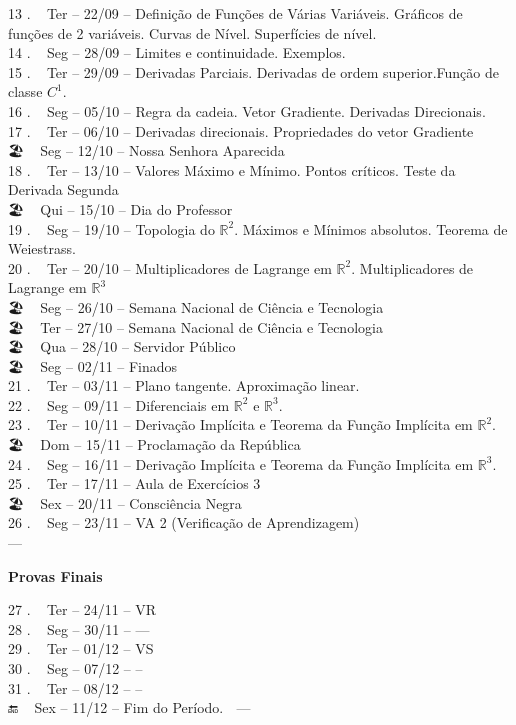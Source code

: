 \documentclass[
  letterpaper,
  DIV=11,
  numbers=noendperiod]{scrartcl}
\begin{document}
13 . ~ Ter -- 22/09 -- { Definição de Funções de Várias Variáveis.
Gráficos de funções de 2 variáveis. Curvas de Nível. Superfícies de
nível. }\\
14 . ~ Seg -- 28/09 -- { Limites e continuidade. Exemplos. }\\
15 . ~ Ter -- 29/09 -- { Derivadas Parciais. Derivadas de ordem
superior.Função de classe \(C^1\). }\\
16 . ~ Seg -- 05/10 -- { Regra da cadeia. Vetor Gradiente. Derivadas
Direcionais. }\\
17 . ~ Ter -- 06/10 -- { Derivadas direcionais. Propriedades do vetor
Gradiente }\\
{🏖️} { ~ Seg -- 12/10 -- Nossa Senhora Aparecida }\\
18 . ~ Ter -- 13/10 -- { Valores Máximo e Mínimo. Pontos críticos. Teste
da Derivada Segunda }\\
{🏖️} { ~ Qui -- 15/10 -- Dia do Professor }\\
19 . ~ Seg -- 19/10 -- { Topologia do \(\mathbb{R}^2\). Máximos e
Mínimos absolutos. Teorema de Weiestrass. }\\
20 . ~ Ter -- 20/10 -- { Multiplicadores de Lagrange em
\(\mathbb{R}^2\). Multiplicadores de Lagrange em \(\mathbb{R}^3\) }\\
{🏖️} { ~ Seg -- 26/10 -- Semana Nacional de Ciência e Tecnologia }\\
{🏖️} { ~ Ter -- 27/10 -- Semana Nacional de Ciência e Tecnologia }\\
{🏖️} { ~ Qua -- 28/10 -- Servidor Público }\\
{🏖️} { ~ Seg -- 02/11 -- Finados }\\
21 . ~ Ter -- 03/11 -- { Plano tangente. Aproximação linear. }\\
22 . ~ Seg -- 09/11 -- { Diferenciais em \(\mathbb{R}^2\) e
\(\mathbb{R}^3\). }\\
23 . ~ Ter -- 10/11 -- { Derivação Implícita e Teorema da Função
Implícita em \(\mathbb{R}^2\). }\\
{🏖️} { ~ Dom -- 15/11 -- Proclamação da República }\\
24 . ~ Seg -- 16/11 -- { Derivação Implícita e Teorema da Função
Implícita em \(\mathbb{R}^3\). }\\
25 . ~ Ter -- 17/11 -- { Aula de Exercícios 3 }\\
{🏖️} { ~ Sex -- 20/11 -- Consciência Negra }\\
{ 26 . ~ Seg -- 23/11 -- VA 2 (Verificação de Aprendizagem) }\\
---

{ \textbf{Provas Finais} }

{ 27 . ~ Ter -- 24/11 -- VR }\\
28 . ~ Seg -- 30/11 -- { --- }\\
{ 29 . ~ Ter -- 01/12 -- VS }\\
30 . ~ Seg -- 07/12 -- { -- }\\
31 . ~ Ter -- 08/12 -- { -- }\\
{🔚} ~ Sex -- 11/12 -- Fim do Período. {🙌} ---
\end{document}
